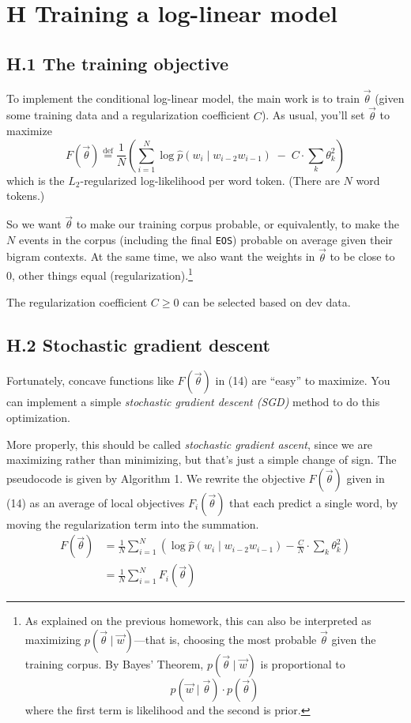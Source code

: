 \section*{H Training a log-linear model}

\subsection*{H.1 The training objective}

To implement the conditional log-linear model, the main work is to train $\vec{\theta}$ (given some training data and a regularization coefficient $C$). As usual, you’ll set $\vec{\theta}$ to maximize
\begin{equation}
F(\vec{\theta}) \stackrel{\text{def}}{=} \frac{1}{N} \left( \sum_{i=1}^N \log \hat{p}(w_i \mid w_{i-2} w_{i-1}) \;-\; C \cdot \sum_k \theta_k^2 \right)
\end{equation}
which is the $L_2$-regularized log-likelihood per word token. (There are $N$ word tokens.)

So we want $\vec{\theta}$ to make our training corpus probable, or equivalently, to make the $N$ events in the corpus (including the final \texttt{EOS}) probable on average given their bigram contexts. At the same time, we also want the weights in $\vec{\theta}$ to be close to 0, other things equal (regularization).\footnote{As explained on the previous homework, this can also be interpreted as maximizing $p(\vec{\theta} \mid \vec{w})$---that is, choosing the most probable $\vec{\theta}$ given the training corpus. By Bayes’ Theorem, $p(\vec{\theta} \mid \vec{w})$ is proportional to 
\[
p(\vec{w} \mid \vec{\theta}) \cdot p(\vec{\theta})
\]
where the first term is likelihood and the second is prior.}  

The regularization coefficient $C \geq 0$ can be selected based on dev data.

\subsection*{H.2 Stochastic gradient descent}

Fortunately, concave functions like $F(\vec{\theta})$ in (14) are “easy” to maximize. You can implement a simple \textit{stochastic gradient descent (SGD)} method to do this optimization.  

More properly, this should be called \textit{stochastic gradient ascent}, since we are maximizing rather than minimizing, but that’s just a simple change of sign. The pseudocode is given by Algorithm 1. We rewrite the objective $F(\vec{\theta})$ given in (14) as an average of local objectives $F_i(\vec{\theta})$ that each predict a single word, by moving the regularization term into the summation.
\begin{align}
F(\vec{\theta}) &= \frac{1}{N} \sum_{i=1}^N \left( \log \hat{p}(w_i \mid w_{i-2} w_{i-1}) - \frac{C}{N}\cdot \sum_k \theta_k^2 \right) \\
&= \frac{1}{N} \sum_{i=1}^N F_i(\vec{\theta})
\end{align}

